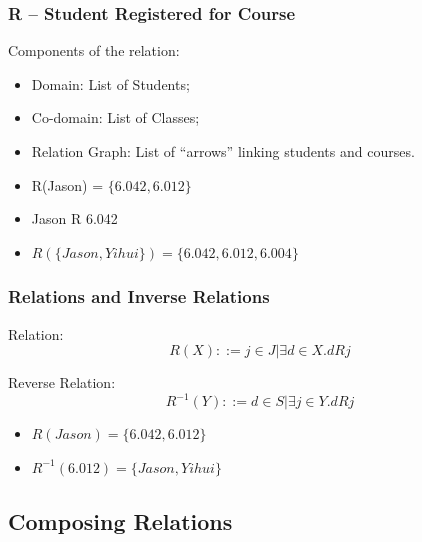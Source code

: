 \documentclass{beamer}
\begin{document}
\begin{frame}
  \frametitle{{\bf R} -- Student Registered for Course}

  {\larger
    Components of the relation:
    \begin{itemize}
    \item Domain: List of Students;
    \item Co-domain: List of Classes;
    \item Relation Graph: List of ``arrows'' linking students and courses.      
      
      \bigskip

    \item R(Jason) = $\{6.042, 6.012\}$
    \item Jason R 6.042
    \item $R(\{Jason, Yihui\}) = \{6.042, 6.012, 6.004\}$
    \end{itemize}
  }
\end{frame}

\begin{frame}
  \frametitle{Relations and Inverse Relations}

  {\larger
    Relation:
    \begin{equation*}
      R(X) ::= {j \in J | \exists d \in X. d R j}
    \end{equation*}

    \bigskip
    Reverse Relation:
    \begin{equation*}
      R^{-1}(Y) ::= {d \in S | \exists j \in Y. d R j}
    \end{equation*}

    \bigskip

    \begin{itemize}
    \item $R(Jason) = \{6.042, 6.012\}$
    \item $R^{-1}(6.012) = \{Jason, Yihui\}$
    \end{itemize}
  }
\end{frame}

\subsection{Composing Relations}
\end{document}
